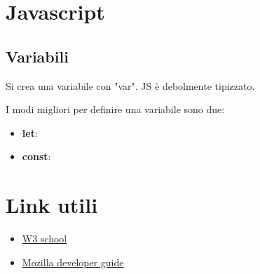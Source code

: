 \documentclass[11pt,a4paper]{book}
\begin{document}
\chapter{Javascript}
\section{Variabili}
Si crea una variabile con "var". JS è debolmente tipizzato.

I modi migliori per definire una variabile sono due:
\begin{itemize}
	\item \textbf{let}: 
	\item \textbf{const}: 
\end{itemize}
\chapter{Link utili}
\begin{itemize}
	\item \href{https://www.w3schools.com/}{W3 school}
	\item \href{https://developer.mozilla.org/it/}{Mozilla developer guide}
\end{itemize}
\end{document}
